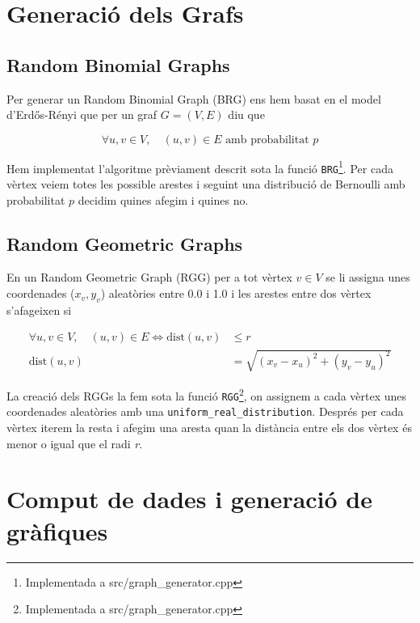 
\section{Generació dels Grafs}
\subsection{Random Binomial Graphs}
Per generar un Random Binomial Graph (BRG) ens hem basat en el model d'Erdős-Rényi \cite{Erdos1960OnGraphs,Erdos1959OnI} que per un graf $G=(V,E)$ diu que

\begin{equation}
    \forall u,v \in V,\quad (u,v) \in E \text{ amb probabilitat } p
\end{equation}

Hem implementat l'algoritme prèviament descrit sota la funció \texttt{BRG}\footnote{Implementada a src/graph\_generator.cpp}. Per cada vèrtex veiem totes les possible arestes i seguint una distribució de Bernoulli amb probabilitat $p$ decidim quines afegim i quines no.

\subsection{Random Geometric Graphs}
En un Random Geometric Graph (RGG)\cite{Diaz2007On} per a tot vèrtex $v \in V$ se li assigna unes coordenades ($x_v, y_v$) aleatòries entre 0.0 i 1.0 i les arestes entre dos vèrtex s'afageixen si

\begin{align}
    \forall u,v \in V,\quad (u,v) \in E \Longleftrightarrow \text{dist}(u,v) &\leq r \\
    \text{dist}(u,v) &= \sqrt{\left(x_v - x_u\right)^2 + \left(y_v - y_u\right)^2}
\end{align}

La creació dels RGGs la fem sota la funció \texttt{RGG}\footnote{Implementada a src/graph\_generator.cpp}, on assignem a cada vèrtex unes coordenades aleatòries amb una \texttt{uniform\_real\_distribution}. Després per cada vèrtex iterem la resta i afegim una aresta quan la distància entre els dos vèrtex és menor o igual que el radi \textit{r}.

\section{Comput de dades i generació de gràfiques}

